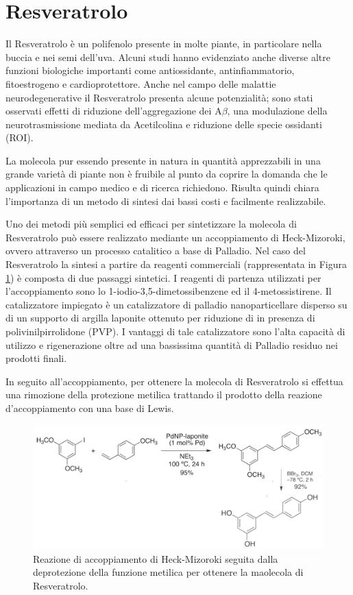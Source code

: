 \documentclass[a4paper, 11pt]{article}
\begin{document}
\section{Resveratrolo}
\label{sec:resv}
Il Resveratrolo è un polifenolo presente in molte piante, in particolare nella buccia e nei semi dell'uva. Alcuni studi hanno evidenziato anche diverse altre funzioni biologiche importanti come antiossidante, antinfiammatorio, fitoestrogeno e cardioprotettore. Anche nel campo delle malattie neurodegenerative il Resveratrolo presenta alcune potenzialità; sono stati osservati effetti di riduzione dell'aggregazione dei A$\beta$, una modulazione della neurotrasmissione mediata da Acetilcolina e riduzione delle specie ossidanti (ROI). \cite{jabir_cholinesterase_2018}

La molecola pur essendo presente in natura in quantità apprezzabili in una grande varietà di piante non è fruibile al punto da coprire la domanda che le applicazioni in campo medico e di ricerca richiedono. Risulta quindi chiara l'importanza di un metodo di sintesi dai bassi costi e facilmente realizzabile.

Uno dei metodi più semplici ed efficaci per sintetizzare la molecola di Resveratrolo può essere realizzato mediante un accoppiamento di Heck-Mizoroki, ovvero attraverso un processo catalitico a base di Palladio.
Nel caso del Resveratrolo la sintesi a partire da reagenti commerciali (rappresentata in Figura \ref{fig:totale_resveratrolo}) è composta di due passaggi sintetici. I reagenti di partenza utilizzati per l'accoppiamento sono lo 1-iodio-3,5-dimetossibenzene ed il 4-metossistirene. Il catalizzatore impiegato è un catalizzatore di palladio nanoparticellare disperso su di un supporto di argilla laponite ottenuto per riduzione di  in presenza di polivinilpirrolidone (PVP). \cite{martinez_extremely_2015}
I vantaggi di tale catalizzatore sono l'alta capacità di utilizzo e rigenerazione oltre ad una bassissima quantità di Palladio residuo nei prodotti finali.

In seguito all'accoppiamento, per ottenere la molecola di Resveratrolo si effettua una rimozione della protezione metilica trattando il prodotto della reazione d'accoppiamento con una base di Lewis. \cite{alejandro_v._martinez_expedient_2017}

\begin{figure}[H]
	\centering
	\includegraphics[width=.7\linewidth]{immagini/totale_resveratrolo.png}
	\caption{Reazione di accoppiamento di Heck-Mizoroki seguita dalla deprotezione della funzione metilica per ottenere la maolecola di Resveratrolo.}
	\label{fig:totale_resveratrolo}
\end{figure}
\end{document}
